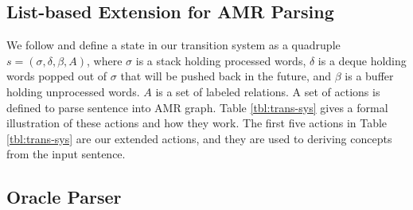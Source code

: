 \documentclass[11pt,a4paper]{article}
\begin{document}
\subsection{List-based Extension for AMR Parsing}\label{sec:trans-sys}



We follow \citet{choi-mccallum:2013:ACL2013} and define a state in our transition
system as a quadruple ${ s = (\sigma, \delta, \beta, A) } $, 
where $\sigma$ is a stack holding processed words, $\delta$ is a deque holding words
popped out of $\sigma$ that will be pushed back in the future, and $\beta$
is a buffer holding unprocessed words. $A$ is a set of labeled relations.
A set of actions is defined to parse sentence into AMR graph.
Table \ref{tbl:trans-sys} gives a formal illustration of these actions and how they work.
The first five actions in Table \ref{tbl:trans-sys} are our extended actions, and
they are used to deriving concepts from
the input sentence.

\subsection{Oracle Parser}\label{sec:oracle-parser}
\end{document}
